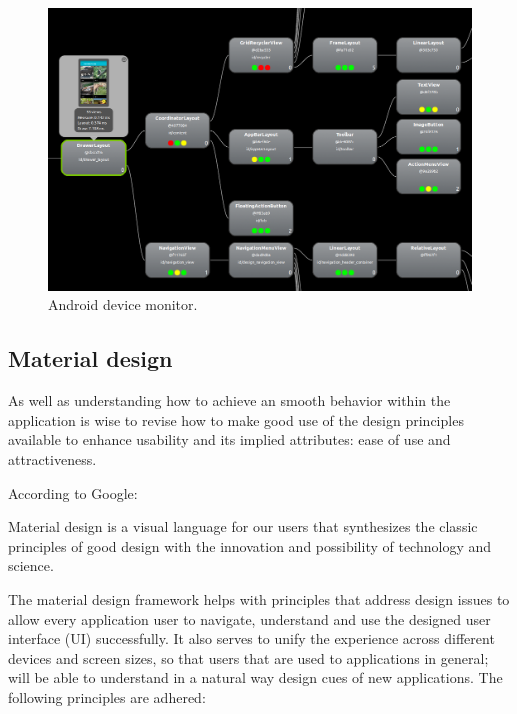 \begin{figure}[H]
\begin{adjustbox}{width=1\textwidth,center=\textwidth}
  \centering
  \includegraphics[scale=1]{images/android_device_monitor_2.png}
\end{adjustbox}
  \caption[Android device monitor]{Android device monitor.}
  \label{fig:android_device_monitor}
\end{figure}

\subsection{Material design}
As well as understanding how to achieve an smooth behavior within the application is wise to revise how to make good use of the design principles available to enhance usability and its implied attributes: ease of use and attractiveness. 

According to Google: \begin{displayquote}Material design is  a visual language for our users that synthesizes the classic principles of good design with the innovation and possibility of technology and science. \end{displayquote} 

The material design framework helps with principles that address design issues to allow every application user to navigate, understand and use the designed user interface (UI) successfully. It also serves to unify the experience across different devices and screen sizes, so that users that are used to applications in general; will be able to understand in a natural way design cues of new applications. The following principles are adhered:   

